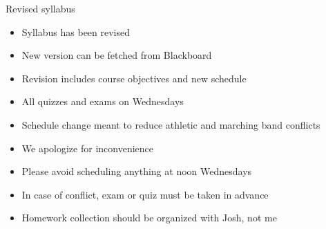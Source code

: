 \documentclass[handout]{beamer}
\theoremstyle{definition}
\begin{document}
\begin{frame}{Revised syllabus}
\begin{itemize}
\item Syllabus has been revised
\item New version can be fetched from Blackboard
\item Revision includes course objectives
and \alert{new schedule}
\item All quizzes and exams on \alert{Wednesdays}
\item Schedule change meant to reduce athletic
and marching band conflicts
\item We apologize for inconvenience
\item Please avoid scheduling \alert{anything} at noon Wednesdays
\item In case of conflict, exam or quiz must be taken \alert{in advance}
\item Homework collection should be organized with Josh, not me
\end{itemize}
\end{frame}
\end{document}
